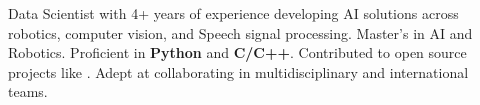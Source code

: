   \item{Data Scientist with 4+ years of experience developing AI solutions across robotics, computer vision, and Speech signal processing. Master's in AI and Robotics. Proficient in \textbf{Python} and \textbf{C/C++}. Contributed to open source projects like . Adept at collaborating in multidisciplinary and international teams.}
  \resumeSubHeadingListEnd

